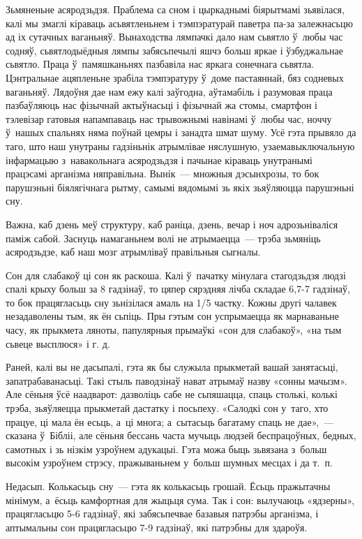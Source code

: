 Зьмяненьне асяродзьдзя. Праблема са сном і цыркаднымі біярытмамі зьявілася, калі мы змаглі кіраваць асьвятленьнем і тэмпэратурай паветра па-за залежнасьцю ад іх сутачных ваганьняў. Вынаходства лямпачкі дало нам сьвятло ў~любы час содняў, сьвятлодыёдныя лямпы забясьпечылі яшчэ больш яркае і ўзбуджальнае сьвятло. Праца ў~памяшканьнях пазбавіла нас яркага сонечнага сьвятла. Цэнтральнае ацяпленьне зрабіла тэмпэратуру ў~доме пастаяннай, бяз содневых ваганьняў. Лядоўня дае нам ежу калі заўгодна, аўтамабіль і разумовая праца пазбаўляюць нас фізычнай актыўнасьці і фізычнай жа стомы, смартфон і тэлевізар гатовыя напампаваць нас трывожнымі навінамі ў~любы час, ноччу ў~нашых спальнях няма поўнай цемры і занадта шмат шуму. Усё гэта прывяло да таго, што наш унутраны гадзіньнік атрымлівае няслушную, узаемавыключальную інфармацыю з~навакольнага асяродзьдзя і пачынае кіраваць унутранымі працэсамі арганізма няправільна. Вынік~--- множныя дэсынхрозы, то бок парушэньні біялягічнага рытму, самымі вядомымі зь якіх зьяўляюцца парушэньні сну.

Важна, каб дзень меў структуру, каб раніца, дзень, вечар і ноч адрозьніваліся паміж сабой. Заснуць намаганьнем волі не атрымаецца~--- трэба зьмяніць асяродзьдзе, каб наш мозг атрымліваў правільныя сыгналы.

Сон для слабакоў ці сон як раскоша. Калі ў~пачатку мінулага стагодзьдзя людзі спалі крыху больш за 8 гадзінаў, то цяпер сярэдняя лічба складае 6,7-7 гадзінаў, то бок працягласьць сну зьнізілася амаль на 1/5 частку. Кожны другі чалавек незадаволены тым, як ён сьпіць. Пры гэтым сон успрымаецца як марнаваньне часу, як прыкмета ляноты, папулярныя прымаўкі «сон для слабакоў», «на тым сьвеце высплюся» і г. д.

Раней, калі вы не дасыпалі, гэта як бы служыла прыкметай вашай занятасьці, запатрабаванасьці. Такі стыль паводзінаў нават атрымаў назву «сонны мачызм». Але сёньня ўсё наадварот: дазволіць сабе не сьпяшацца, спаць столькі, колькі трэба, зьяўляецца прыкметай дастатку і посьпеху. «Салодкі сон у~таго, хто працуе, ці мала ён есьць, а~ці многа; а~сытасьць багатаму спаць не дае»,~--- сказана ў~Бібліі, але сёньня бессань часта мучыць людзей беспрацоўных, бедных, самотных і зь нізкім узроўнем адукацыі. Гэта можа быць зьвязана з~больш высокім узроўнем стрэсу, пражываньнем у~больш шумных месцах і да т.~п.

Недасып. Колькасьць сну~--- гэта як колькасьць грошай. Ёсьць пражытачны мінімум, а~ёсьць камфортная для жыцьця сума. Так і сон: вылучаюць «ядзерны», працягласьцю 5-6 гадзінаў, які забясьпечвае базавыя патрэбы арганізма, і аптымальны сон працягласьцю 7-9 гадзінаў, які патрэбны для здароўя.

